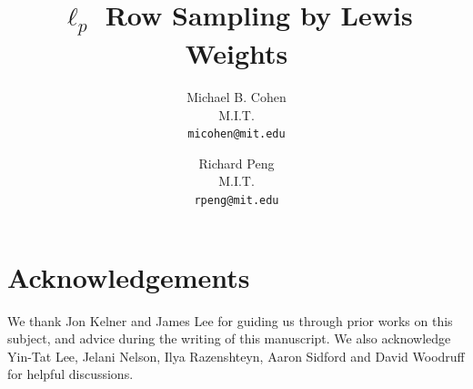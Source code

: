 \documentclass[11pt]{article}
\theoremstyle{definition}
\begin{document}
\title{$\ell_p$ Row Sampling by Lewis Weights}

\author{
  Michael B. Cohen\\
  M.I.T.\\
  \texttt{micohen@mit.edu}
  \and
 Richard Peng\\
  M.I.T.\\
  \texttt{rpeng@mit.edu}
}

\maketitle




\pagebreak


















\section*{Acknowledgements}
We thank Jon Kelner and James Lee for guiding us through prior
works on this subject, and advice during the writing of this manuscript.
We also acknowledge Yin-Tat Lee, Jelani Nelson, Ilya Razenshteyn, Aaron Sidford and David Woodruff
for helpful discussions.




\begin{appendix}





\end{appendix}
\end{document}
